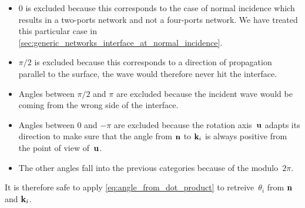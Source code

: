 \begin{itemize}
    \item 0 is excluded because this corresponds to the case of normal incidence which results in a two-ports network and not a four-ports network.  We have treated this particular case in \vref{sec:generic_networks_interface_at_normal_incidence}.
    \item $\pi/2$ is excluded because this corresponds to a direction of propagation parallel to the surface, the wave would therefore never hit the interface.
    \item Angles between $\pi/2$ and $\pi$ are excluded because the incident wave would be coming from the wrong side of the interface.
    \item Angles between 0 and $-\pi$ are excluded because the rotation axis~$\mathbf{u}$ adapts its direction to make sure that the angle from $\mathbf{n}$ to $\mathbf{k}_i$ is always positive from the point of view of~$\mathbf{u}$.
    \item The other angles fall into the previous categories because of the modulo~$2\pi$.
\end{itemize}
It is therefore safe to apply \cref{eq:angle_from_dot_product} to retreive~$\theta_i$ from $\mathbf{n}$ and $\mathbf{k}_i$.



